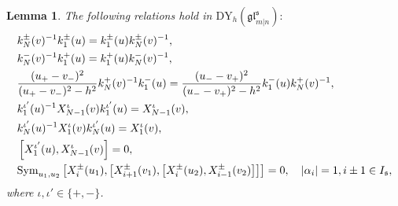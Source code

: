 \documentclass[a4paper,12pt]{article}
\newtheorem{lemm}[theo]{Lemma}
\numberwithin{equation}{section}
\begin{document}
\begin{lemm}
The following relations hold in $\mathrm{DY}_{h}(\mathfrak{gl}^{\mathfrak{s}}_{m|n}):$
\begin{align}\label{kNk1}
&k_{N}^{\pm}(v)^{-1}k_{1}^{\pm}(u)=k_{1}^{\pm}(u)k_{N}^{\pm}(v)^{-1},\\ \label{kN-k1+}
&k_{N}^{-}(v)^{-1}k_{1}^{+}(u)=k_{1}^{+}(u)k_{N}^{-}(v)^{-1},\\ \label{kN+k1-}
&\frac{(u_{+}-v_{-})^{2}}{(u_{+}-v_{-})^{2}-h^{2}}k_{N}^{+}(v)^{-1}k_{1}^{-}(u)=\frac{(u_{-}-v_{+})^{2}}{(u_{-}-v_{+})^{2}-h^{2}}k_{1}^{-}(u)k_{N}^{+}(v)^{-1},\\ \label{k1XN-1}
&k_{1}^{\iota'}(u)^{-1}X_{N-1}^{\iota}(v)k_{1}^{\iota'}(u)=X_{N-1}^{\iota}(v),\\ \label{kNX1}
&k_{N}^{\iota'}(u)^{-1}X_{1}^{\iota}(v)k_{N}^{\iota'}(u)=X_{1}^{\iota}(v),\\  
\label{X1XN-1}
&\left[X_{1}^{\iota'}(u),X_{N-1}^{\iota}(v)\right]=0,\\ \label{serre i}
&{\rm Sym}_{u_{1},u_{2}}\left[X_{i}^{\pm}(u_{1}),\left[X_{i+1}^{\pm}(v_{1}),\left[
X_{i}^{\pm}(u_{2}),X_{i-1}^{\pm}(v_{2})\right]\right]\right]=0, \quad |\alpha_{i}|=1, i\pm1\in I_{\mathfrak{s}},
\end{align}
where $\iota,\iota'\in\{+,-\}$.
\end{lemm}
\end{document}
